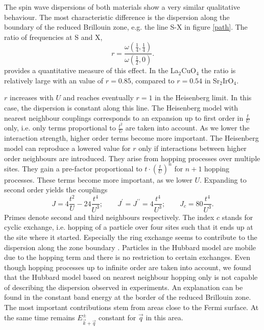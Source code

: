 The spin wave dispersions of both materials show a very similar qualitative behaviour.
The most characteristic difference is the dispersion along the boundary of the reduced Brillouin zone, e.g. the line S-X in figure \ref{path}.
The ratio of frequencies at S and X,
\begin{equation} 
r = \frac{ \omega(\frac14,\frac14) }{ \omega(\frac12,0) }. 
\end{equation}
provides a quantitative measure of this effect. 
In the La$_2$CuO$_4$ the ratio is relatively large with an value of $r = 0.85$, compared to $r=0.54$ in
Sr$_2$IrO$_4$.

$r$ increases with $U$ and reaches eventually $r=1$ 
in the Heisenberg limit.
In this case, the dispersion is constant along this line.
The Heisenberg model with nearest neighbour couplings corresponds to an expansion up to first order in $\frac tU$ only, 
i.e. only terms proportional to $\frac {t^2}{U}$ are taken into account.
As we lower the interaction strength, higher order terms become more important.
The Heisenberg model can reproduce a lowered value for $r$ only if interactions between higher order neighbours are introduced.
They arise from  hopping processes over multiple sites.
They gain a pre-factor proportional to $t\cdot(\frac tU)^n$  for $n+1$ hopping processes.
These terms become more important, as we lower $U$. 
Expanding to second order yields  the couplings \cite{0022-3719-10-8-031} 
\begin{equation}
 J = 4\frac{t^2}{U} -24\frac{t^4}{U^3}; \qquad J^{\prime} = J^{\prime \prime} = 4\frac{t^4}{U^3}; \qquad J_c = 80 \frac{t^4}{U^3}.
\end{equation}
Primes denote second and third neighbours respectively.
The index $c$ stands for cyclic exchange, 
i.e. hopping of a particle over four sites such that it ends up at the site where it started. 
Especially the ring exchange seems to contribute to the dispersion along the zone boundary \cite{PhysRevLett.86.5377}.
Particles in the Hubbard model are mobile due to the hopping term and there is no restriction to certain exchanges.
%
%
%
Even though  hopping processes up to infinite order are taken into account,
we found that the Hubbard model based on nearest neighbour hopping only is not capable of describing the dispersion observed in experiments.
An explanation can be found in the constant band energy at the border of the reduced Brillouin zone.
The most important contributions stem from areas close to the Fermi surface. 
At the same time remains $E^{\pm}_{\vec k + \vec q}$ constant for $\vec q$ in this area.

